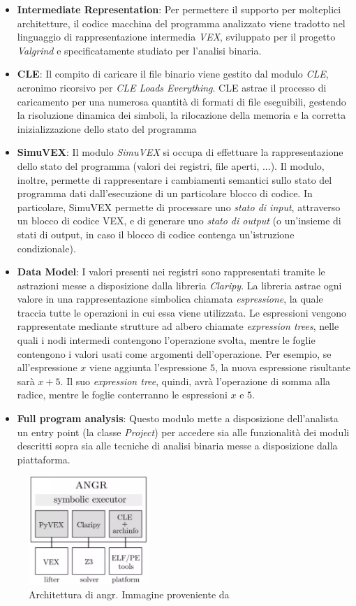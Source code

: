 \documentclass[../main.tex]{subfiles}
\begin{document}
\begin{itemize}
    \item \textbf{Intermediate Representation}: Per permettere il supporto per molteplici architetture, il codice macchina del programma analizzato viene tradotto nel linguaggio di rappresentazione intermedia \textit{VEX}, sviluppato per il progetto \textit{Valgrind} e specificatamente studiato per l'analisi binaria.
    \item \textbf{CLE}: Il compito di caricare il file binario viene gestito dal modulo \textit{CLE}, acronimo ricorsivo per \textit{CLE Loads Everything}. CLE astrae il processo di caricamento per una numerosa quantità di formati di file eseguibili, gestendo la risoluzione dinamica dei simboli, la rilocazione della memoria
    e la corretta inizializzazione dello stato del programma
    \item \textbf{SimuVEX}: Il modulo \textit{SimuVEX} si occupa di effettuare la rappresentazione dello stato del programma (valori dei registri, file aperti, ...). Il modulo, inoltre, permette di rappresentare i cambiamenti semantici sullo stato del programma dati dall'esecuzione di un particolare blocco di codice. In particolare, SimuVEX permette
    di processare uno \textit{stato di input}, attraverso un blocco di codice VEX, e di generare uno \textit{stato di output} (o un'insieme di stati di output, in caso il blocco di codice contenga un'istruzione condizionale). 
    \item \textbf{Data Model}: I valori presenti nei registri sono rappresentati tramite le astrazioni messe a disposizione dalla libreria \textit{Claripy}. 
    La libreria astrae ogni valore in una rappresentazione simbolica chiamata \textit{espressione}, la quale traccia tutte le operazioni in cui essa viene utilizzata.
    Le espressioni vengono rappresentate mediante strutture ad albero chiamate \textit{expression trees}, nelle quali i nodi intermedi contengono l'operazione svolta, mentre le foglie contengono i valori usati come argomenti dell'operazione.
    Per esempio, se all'espressione $x$ viene aggiunta l'espressione $5$, la nuova espressione risultante sarà $x+5$. Il suo \textit{expression tree}, quindi, avrà l'operazione di somma alla radice, mentre le foglie conterranno le espressioni $x$ e $5$.
    \item \textbf{Full program analysis}: Questo modulo mette a disposizione dell'analista un entry point (la classe \textit{Project}) per accedere sia alle funzionalità dei moduli descritti sopra sia alle tecniche di analisi binaria messe a disposizione dalla piattaforma.
\end{itemize}
\begin{figure}[H]
    \centering
    \includegraphics[width = 0.40\textwidth]{../images/angr_architecture.png}
    \caption{Architettura di angr. Immagine proveniente da \cite{angr_architecture}}
\end{figure}
\end{document}
